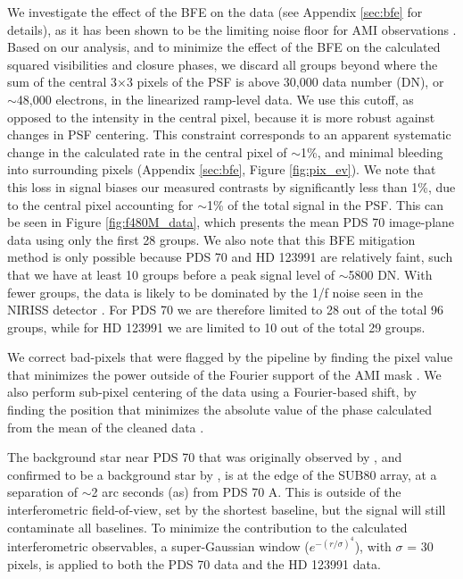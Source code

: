 \documentclass[11pt,twocolumn,twocolappendix]{aastex631}
\begin{document}
We investigate the effect of the BFE on the data (see Appendix \ref{sec:bfe} for details), as it has been shown to be the limiting noise floor for AMI observations \citep{2023PASP..135a5003S,2023PASP..135a4502K,2023arXiv231011508R,2023arXiv231011499S}. Based on our analysis, and to minimize the effect of the BFE on the calculated squared visibilities and closure phases, we discard all groups beyond where the sum of the central 3$\times$3 pixels of the PSF is above 30,000 data number (DN), or $\sim$48,000 electrons, in the linearized ramp-level data. We use this cutoff, as opposed to the intensity in the central pixel, because it is more robust against changes in PSF centering. This constraint corresponds to an apparent systematic change in the calculated rate in the central pixel of $\sim$1\%, and minimal bleeding into surrounding pixels (Appendix \ref{sec:bfe}, Figure \ref{fig:pix_ev}). We note that this loss in signal biases our measured contrasts by significantly less than 1\%, due to the central pixel accounting for $\sim$1\% of the total signal in the PSF. {This can be seen in Figure \ref{fig:f480M_data}, which presents the mean PDS 70 image-plane data using only the first 28 groups.} We also note that this BFE mitigation method is only possible because PDS 70 and HD 123991 are relatively faint, such that we have at least 10 groups before a peak signal level of $\sim$5800 DN. With fewer groups, the data is likely to be dominated by the 1/f noise seen in the NIRISS detector \citep[e.g.,][]{2023arXiv231011499S}. For PDS 70 we are therefore limited to 28 out of the total 96 groups, while for HD 123991 we are limited to 10 out of the total 29 groups.

We correct bad-pixels that were flagged by the pipeline by finding the pixel value that minimizes the power outside of the Fourier support of the AMI mask \citep{2013MNRAS.433.1718I}. We also perform sub-pixel centering of the data using a Fourier-based shift, by finding the position that minimizes the absolute value of the phase calculated from the mean of the cleaned data \citep{2019MNRAS.486..639K}.

The background star near PDS 70 that was originally observed by \cite{2006A&A...458..317R}, and confirmed to be a background star by \cite{2012ApJ...758L..19H}, is at the edge of the SUB80 array, at a separation of {$\sim$2 arc seconds (as) from PDS 70 A}. This is outside of the interferometric field-of-view, set by the shortest baseline, but the signal will still contaminate all baselines. To minimize the contribution to the calculated interferometric observables, a super-Gaussian window ($e^{-(r/\sigma)^4}$), with $\sigma$ = 30 pixels,  %
is applied to both the PDS 70 data and the HD 123991 data. 
\end{document}
